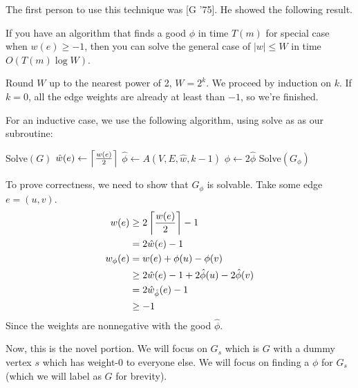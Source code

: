 The first person to use this technique was [G '75]. He showed the following result.

\begin{theorem} If you have an algorithm that finds a good $\phi$ in time $T(m)$ for special case
when $w(e) \geq -1$, then you can solve the general case of $|w| \leq W$ in time $O(T(m) \log W)$.

\begin{proof*}
    Round $W$ up to the nearest power of 2, $W = 2^k$. We proceed by induction on $k$. If $k = 0$, all the edge weights are already at least than $-1$, so we're finished.

    For an inductive case, we use the following algorithm, using solve as as our subroutine:
    \begin{algorithmic}
             \State \Return Solve$(G)$
            \Else
            \State $\hat{w}(e) \gets \left\lceil \frac{w(e)}{2} \right\rceil$
            \State $\hat{\phi} \gets A(V, E, \hat{w}, k - 1)$
            \State $\phi \gets 2 \hat{\phi}$
            \State \Return Solve$(G_{\phi})$
            \EndIf
        \EndFunction
    \end{algorithmic}

    To prove correctness, we need to show that $G_{\phi}$ is solvable. Take some edge $e = (u, v)$.
    \begin{align*}
        w(e) &\geq 2 \left\lceil \frac{w(e)}{2} \right\rceil - 1 \\
        &= 2 \hat{w}(e) - 1 \\
        w_{\phi}(e) &= w(e) + \phi(u) - \phi(v) \\
        &\geq 2 \hat{w}(e) - 1 + 2 \hat{\phi}(u) - 2 \hat{\phi}(v) \\
        &= 2 \hat{w}_{\hat{\phi}}(e) - 1 \\
        &\geq -1
    \end{align*}
    Since the weights are nonnegative with the good $\hat{\phi}$.
\end{proof*}
\end{theorem}

Now, this is the novel portion.
We will focus on $G_s$ which is $G$ with a dummy vertex $s$ which has weight-0 to everyone else. We will focus on finding a $\phi$ for $G_s$ (which we will label as $G$ for brevity).

